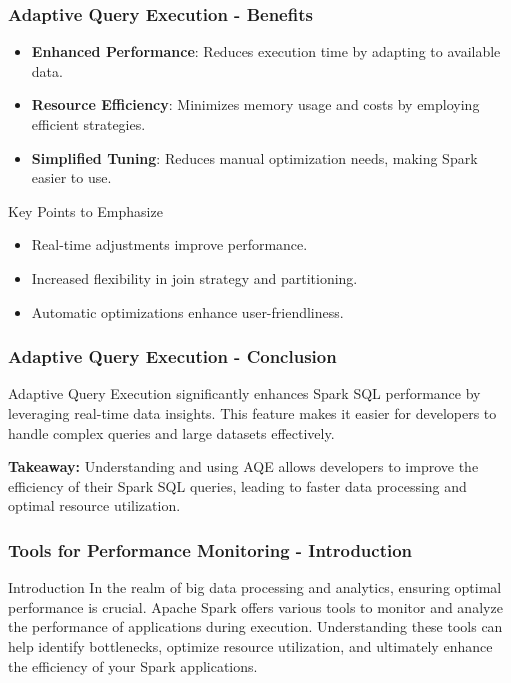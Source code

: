 \documentclass[aspectratio=169]{beamer}
\begin{document}
\begin{frame}[fragile]
    \frametitle{Adaptive Query Execution - Benefits}
    \begin{itemize}
        \item \textbf{Enhanced Performance}: Reduces execution time by adapting to available data.
        \item \textbf{Resource Efficiency}: Minimizes memory usage and costs by employing efficient strategies.
        \item \textbf{Simplified Tuning}: Reduces manual optimization needs, making Spark easier to use.
    \end{itemize}
    
    \begin{block}{Key Points to Emphasize}
        \begin{itemize}
            \item Real-time adjustments improve performance.
            \item Increased flexibility in join strategy and partitioning.
            \item Automatic optimizations enhance user-friendliness.
        \end{itemize}
    \end{block}
\end{frame}

\begin{frame}[fragile]
    \frametitle{Adaptive Query Execution - Conclusion}
    Adaptive Query Execution significantly enhances Spark SQL performance by leveraging real-time data insights. This feature makes it easier for developers to handle complex queries and large datasets effectively.

    \textbf{Takeaway:} Understanding and using AQE allows developers to improve the efficiency of their Spark SQL queries, leading to faster data processing and optimal resource utilization.
\end{frame}

\begin{frame}[fragile]
    \frametitle{Tools for Performance Monitoring - Introduction}
    \begin{block}{Introduction}
        In the realm of big data processing and analytics, ensuring optimal performance is crucial. Apache Spark offers various tools to monitor and analyze the performance of applications during execution. Understanding these tools can help identify bottlenecks, optimize resource utilization, and ultimately enhance the efficiency of your Spark applications.
    \end{block}
\end{frame}
\end{document}
